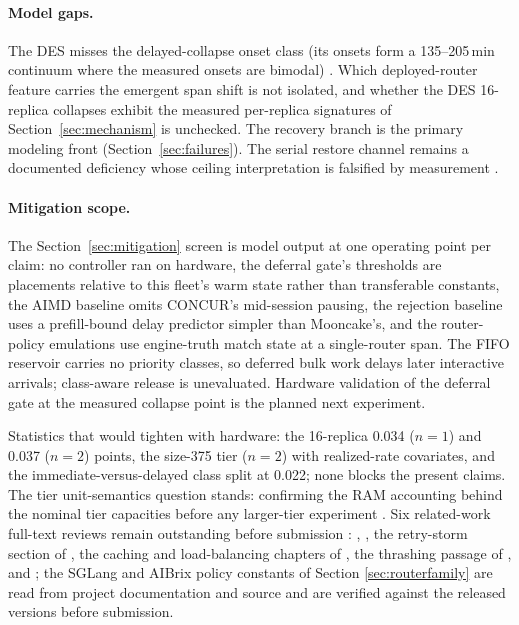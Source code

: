 \paragraph{Model gaps.} The DES misses the delayed-collapse onset class (its
onsets form a 135--205\,min continuum where the measured onsets are
bimodal) . Which deployed-router feature carries the emergent
span shift is not isolated, and whether the DES 16-replica collapses
exhibit the measured per-replica signatures of Section~\ref{sec:mechanism} is
unchecked. The recovery branch is the primary modeling front
(Section~\ref{sec:failures}). The serial restore channel remains a documented
deficiency whose ceiling interpretation is falsified by measurement
.

\paragraph{Mitigation scope.} The Section~\ref{sec:mitigation} screen is model output at one
operating point per claim: no controller ran on hardware, the
deferral gate's thresholds are placements relative to this fleet's
warm state rather than transferable constants, the AIMD baseline
omits CONCUR's mid-session pausing, the rejection baseline uses a
prefill-bound delay predictor simpler than Mooncake's, and the
router-policy emulations use engine-truth match state at a
single-router span. The FIFO reservoir carries no priority classes,
so deferred bulk work delays later interactive arrivals; class-aware
release is unevaluated. Hardware validation of the deferral gate at
the measured collapse point is the planned next experiment.

Statistics that would tighten with hardware: the 16-replica 0.034
($n=1$) and 0.037 ($n=2$) points, the size-375 tier ($n=2$) with
realized-rate covariates, and the immediate-versus-delayed class
split at 0.022; none blocks the present claims. The tier
unit-semantics question stands: confirming the RAM accounting behind
the nominal tier capacities before any larger-tier experiment .
Six related-work full-text reviews remain outstanding before
submission : \cite{ao2026congestion},
\cite{vanrooyen2026collapse}, the retry-storm section of
\cite{pandey2026failureatlas}, the caching and load-balancing chapters of
\cite{nixon2026yearserving}, the thrashing passage of \cite{yuan2026agentic},
and \cite{aqua2025}; the SGLang and AIBrix policy constants of Section
\ref{sec:routerfamily} are read from project documentation and source and are verified
against the released versions before submission.
